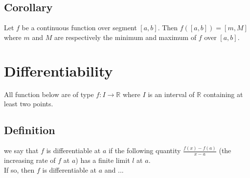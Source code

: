 \documentclass[notitlepage]{math}
\begin{document}
\subsection{Corollary}
Let $f$ be a continuous function over segment $[a,b]$. Then $f([a,b]) = [m,M]$ where $m$ and $M$ are respectively the minimum and maximum of $f$ over $[a,b]$.
\section{Differentiability}
All function below are of type $f: I \to \mathbb{R}$ where $I$ is an interval of $\mathbb{R}$ containing at least two points.
\subsection{Definition}
we say that $f$ is differentiable at $a$ if the following quantity $\frac{f(x)-f(a)}{x-a}$ (the increasing rate of $f$ at $a$) has a finite limit $l$ at $a$.\\
If so, then $f$ is differentiable at $a$ and ...
\end{document}
